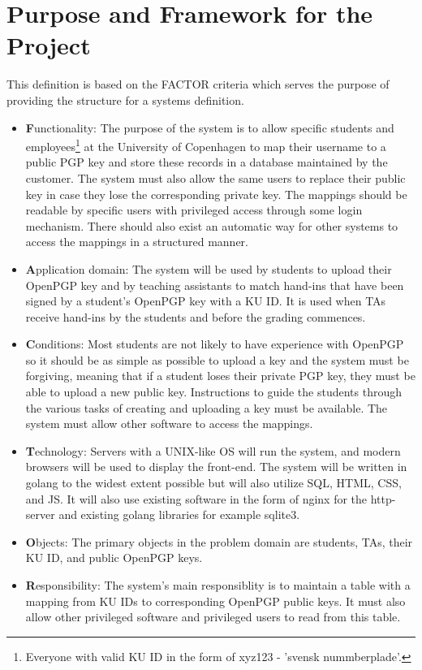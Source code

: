 \documentclass[11pt,a4paper]{report}
\begin{document}
\section{Purpose and Framework for the Project}\label{sec:Purpose_Framework}
This definition is based on the FACTOR criteria\cite{book:factor} which serves the purpose of providing the structure for a systems definition.
\begin{itemize}
\item \textbf{F}unctionality: The purpose of the system is to allow specific students and employees\footnote{Everyone with valid KU ID in the form of xyz123 - 'svensk nummberplade'.} at the University of Copenhagen to map their username to a public PGP key and store these records in a database maintained by the customer. The system must also allow the same users to replace their public key in case they lose the corresponding private key. The mappings should be readable by specific users with privileged access through some login mechanism.
There should also exist an automatic way for other systems to access the mappings in a structured manner.
\item \textbf{A}pplication domain: The system will be used by students to upload their OpenPGP key and by teaching assistants to match hand-ins that have been signed by a student's OpenPGP key with a KU ID. It is used when TAs receive hand-ins by the students and before the grading commences.
\item \textbf{C}onditions: Most students are not likely to have experience with OpenPGP so it should be as simple as possible to upload a key and the system must be forgiving, meaning that if a student loses their private PGP key, they must be able to upload a new public key. Instructions to guide the students through the various tasks of creating and uploading a key must be available. The system must allow other software to access the mappings.
\item \textbf{T}echnology: Servers with a UNIX-like OS will run the system, and modern browsers will be used to display the front-end. The system will be written in golang to the widest extent possible but will also utilize SQL, HTML, CSS, and JS. It will also use existing software in the form of nginx for the http-server and existing golang libraries for example sqlite3.
\item \textbf{O}bjects: The primary objects in the problem domain are students, TAs, their KU ID, and public OpenPGP keys.
\item \textbf{R}esponsibility: The system's main responsiblity is to maintain a table with a mapping from KU IDs to corresponding OpenPGP public keys. It must also allow other privileged software and privileged users to read from this table.
\end{itemize}
\end{document}
